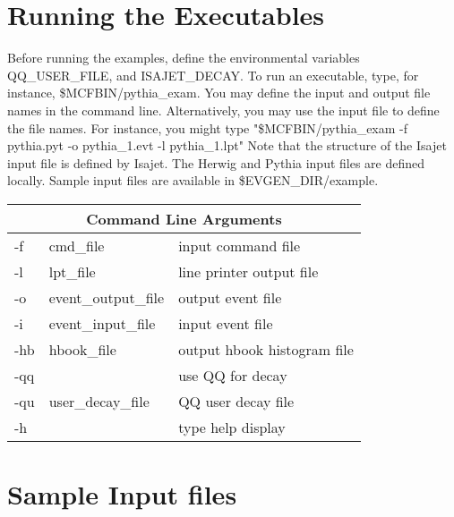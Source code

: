 \section{Running the Executables}

Before running the examples, 
define the environmental variables QQ\_USER\_FILE, 
and ISAJET\_DECAY. 
To run an executable, type, for instance, \$MCFBIN/pythia\_exam.
You may define the input and output file names in the command line.
Alternatively, you may use the input file to define the file names.
For instance, you might type 
"\$MCFBIN/pythia\_exam -f pythia.pyt -o pythia\_1.evt -l pythia\_1.lpt"
Note that the structure of the Isajet input file is defined by Isajet.
The Herwig and Pythia input files are defined locally.
Sample input files are available in \$EVGEN\_DIR/example.
 

\vspace{0.2 in}

\begin{tabular}{|l|l|l|} \hline
\multicolumn{3}{|c|}{Command Line Arguments} \\ \hline
 -f & cmd\_file & input command file \\ \hline
 -l & lpt\_file & line printer output file \\ \hline
 -o & event\_output\_file & output event file \\ \hline
 -i & event\_input\_file & input event file \\ \hline
 -hb & hbook\_file & output hbook histogram file \\ \hline
 -qq &  & use QQ for decay \\ \hline
 -qu & user\_decay\_file & QQ user decay file \\ \hline
 -h  &  & type help display \\ \hline
\end{tabular}

\section{Sample Input files}


